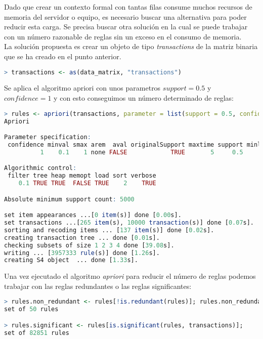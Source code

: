 \documentclass[../../main.tex]{subfiles}
\begin{document}
Dado que crear un contexto formal con tantas filas consume muchos recursos de memoria del servidor o equipo, es necesario buscar una alternativa para poder reducir esta carga. Se precisa buscar otra solución en la cual se puede trabajar con un número razonable de reglas sin un exceso en el consumo de memoria. \\

La solución propuesta es crear un objeto de tipo \textit{transactions} de la matriz binaria que se ha creado en el punto anterior.

\begin{lstlisting}[language=R]
> transactions <- as(data_matrix, "transactions")
\end{lstlisting}

\vskip 0.2in

Se aplica el algoritmo \gls{apriori} con unos parametros $support = 0.5$ y $confidence = 1$ y con esto conseguimos un número determinado de reglas:

\begin{lstlisting}[language=R]
> rules <- apriori(transactions, parameter = list(support = 0.5, confidence = 1, maxlen = 5));
Apriori

Parameter specification:
 confidence minval smax arem  aval originalSupport maxtime support minlen maxlen target  ext
          1    0.1    1 none FALSE            TRUE       5     0.5      1      5  rules TRUE

Algorithmic control:
 filter tree heap memopt load sort verbose
    0.1 TRUE TRUE  FALSE TRUE    2    TRUE

Absolute minimum support count: 5000 

set item appearances ...[0 item(s)] done [0.00s].
set transactions ...[265 item(s), 10000 transaction(s)] done [0.07s].
sorting and recoding items ... [137 item(s)] done [0.02s].
creating transaction tree ... done [0.01s].
checking subsets of size 1 2 3 4 done [39.08s].
writing ... [3957333 rule(s)] done [1.26s].
creating S4 object  ... done [1.33s].
\end{lstlisting}

\vskip 0.2in

Una vez ejecutado el algoritmo \textit{\Gls{apriori}} para reducir el número de reglas podemos trabajar con las reglas redundantes o las reglas significantes:

\begin{lstlisting}[language=R]
> rules.non_redundant <- rules[!is.redundant(rules)]; rules.non_redundant
set of 50 rules 

> rules.significant <- rules[is.significant(rules, transactions)]; 
set of 82851 rules 
\end{lstlisting}
\end{document}
